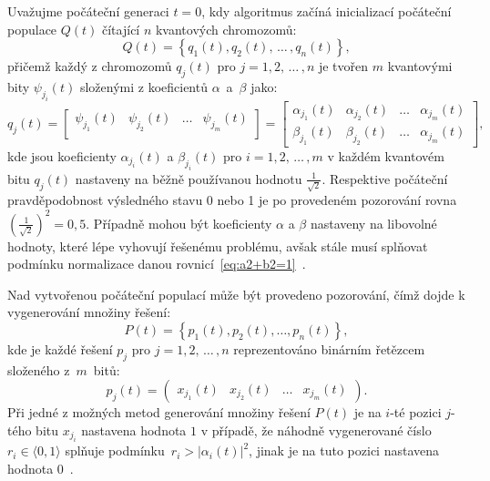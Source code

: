 Uvažujme počáteční generaci $t=0$, kdy algoritmus začíná inicializací počáteční populace $Q\left(t\right)$ čítající $n$ kvantových chromozomů:
\begin{equation}\label{eq:q(t)}
    Q\left(t\right) = \left\{ q_1\left(t\right), q_2\left(t\right),\,\dots\,, q_n\left(t\right) \right\},
\end{equation}
přičemž každý z chromozomů $q_j\left(t\right)$ pro $j = 1,2,\,\dots\,,n$ je tvořen $m$ kvantovými bity $\psi_{j_i}\left(t\right)$ složenými z koeficientů $\alpha$~a~$\beta$ jako:
\begin{equation*}
    q_j\left(t\right) =
    \begin{bmatrix}
        \psi_{j_1}\left(t\right) & \psi_{j_2}\left(t\right) & \dots & \psi_{j_m}\left(t\right) \\
    \end{bmatrix}
    =
    \begin{bmatrix}
        \alpha_{j_1}\left(t\right) & \alpha_{j_2}\left(t\right) & \dots & \alpha_{j_m}\left(t\right) \\
        \beta_{j_1}\left(t\right)  & \beta_{j_2}\left(t\right)  & \dots & \alpha_{j_m}\left(t\right)
    \end{bmatrix},
\end{equation*}
kde jsou koeficienty $\alpha_{j_i}\left(t\right)$ a $\beta_{j_i}\left(t\right)$ pro $i = 1,2,\,\dots\,,m$ v každém kvantovém bitu $q_j\left(t\right)$ nastaveny na běžně používanou hodnotu $\frac{1}{\sqrt{2}}$. 
Respektive počáteční pravděpodobnost výsledného stavu 0 nebo 1 je po provedeném pozorování rovna $\left(\frac{1}{\sqrt{2}}\right)^2 = 0,5$. 
Případně mohou být koeficienty $\alpha$ a $\beta$ nastaveny na libovolné hodnoty, které lépe vyhovují řešenému problému, avšak stále musí splňovat podmínku normalizace danou rovnicí~\ref{eq:a2+b2=1}~\cite{NaturalComputing,qiga}. 

Nad vytvořenou počáteční populací může být provedeno pozorování, čímž dojde k vygenerování množiny řešení:
\begin{equation}\label{eq:p(t)}
    P\left(t\right) = \left\{ p_1\left(t\right), p_2\left(t\right), \dots, p_n\left(t\right) \right\},
\end{equation}
kde je každé řešení $p_j$ pro $j = 1, 2,\,\dots\,, n$ reprezentováno binárním řetězcem složeného z~$m$~bitů:
\begin{equation*}
    p_j\left(t\right) = 
    \begin{pmatrix}
        x_{j_1}\left(t\right) & x_{j_2}\left(t\right) & \dots & x_{j_m}\left(t\right)
    \end{pmatrix}.
\end{equation*}
Při jedné z možných metod generování množiny řešení $P\left(t\right)$ je na $i$-té pozici $j$-tého bitu $x_{j_{i}}$ nastavena hodnota $1$ v případě, že náhodně vygenerované číslo $r_i \in \langle 0, 1\rangle$ splňuje podmínku~$r_i > \left| \alpha_i\left(t\right) \right|^2$, jinak je na tuto pozici nastavena hodnota $0$~\cite{NaturalComputing,qiga}.

